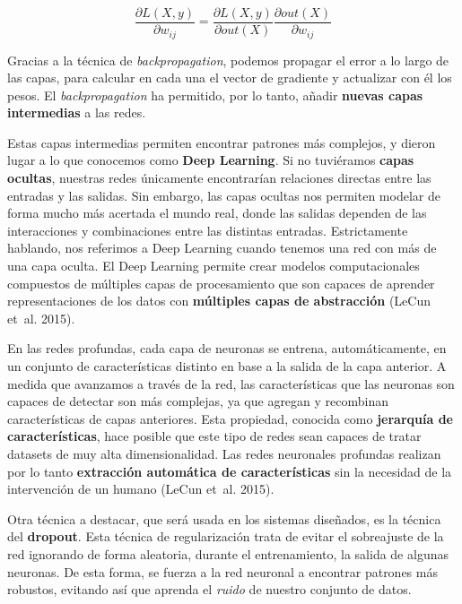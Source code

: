 \documentclass[
  12pt,
  spanish,
  a4paperpaper,
]{report}
\begin{document}
\begin{equation} \label{eq:train6}
 \frac{\partial L(X,y)}{\partial  w_{ij}} =  \frac{\partial L(X,y)}{\partial out(X)} \frac{\partial out(X)}{\partial  w_{ij}}
\end{equation}

Gracias a la técnica de \emph{backpropagation}, podemos propagar el
error a lo largo de las capas, para calcular en cada una el vector de
gradiente y actualizar con él los pesos. El \emph{backpropagation} ha
permitido, por lo tanto, añadir \textbf{nuevas capas intermedias} a las
redes.

Estas capas intermedias permiten encontrar patrones más complejos, y
dieron lugar a lo que conocemos como \textbf{Deep Learning}. Si no
tuviéramos \textbf{capas ocultas}, nuestras redes únicamente
encontrarían relaciones directas entre las entradas y las salidas. Sin
embargo, las capas ocultas nos permiten modelar de forma mucho más
acertada el mundo real, donde las salidas dependen de las interacciones
y combinaciones entre las distintas entradas. Estrictamente hablando,
nos referimos a Deep Learning cuando tenemos una red con más de una capa
oculta. El Deep Learning permite crear modelos computacionales
compuestos de múltiples capas de procesamiento que son capaces de
aprender representaciones de los datos con \textbf{múltiples capas de
abstracción} (LeCun et~al. 2015).

En las redes profundas, cada capa de neuronas se entrena,
automáticamente, en un conjunto de características distinto en base a la
salida de la capa anterior. A medida que avanzamos a través de la red,
las características que las neuronas son capaces de detectar son más
complejas, ya que agregan y recombinan características de capas
anteriores. Esta propiedad, conocida como \textbf{jerarquía de
características}, hace posible que este tipo de redes sean capaces de
tratar datasets de muy alta dimensionalidad. Las redes neuronales
profundas realizan por lo tanto \textbf{extracción automática de
características} sin la necesidad de la intervención de un humano (LeCun
et~al. 2015).

Otra técnica a destacar, que será usada en los sistemas diseñados, es la
técnica del \textbf{dropout}. Esta técnica de regularización trata de
evitar el sobreajuste de la red ignorando de forma aleatoria, durante el
entrenamiento, la salida de algunas neuronas. De esta forma, se fuerza a
la red neuronal a encontrar patrones más robustos, evitando así que
aprenda el \emph{ruido} de nuestro conjunto de datos.
\end{document}
